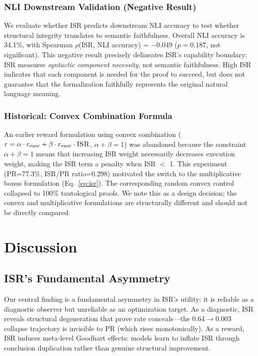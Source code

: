 \documentclass[11pt,a4paper]{article}
\newcommand{\isr}{\textsc{ISR}}
\newcommand{\pr}{\textsc{PR}}
\begin{document}
\subsubsection{NLI Downstream Validation (Negative Result)}
\label{sec:nli}

We evaluate whether \isr{} predicts downstream NLI accuracy to test whether structural integrity translates to semantic faithfulness.
Overall NLI accuracy is 34.1\%, with Spearman $\rho$(\isr{}, NLI accuracy) = $-0.049$ ($p{=}0.187$, not significant).
This negative result precisely delineates \isr{}'s capability boundary: \isr{} measures \emph{syntactic component necessity}, not semantic faithfulness.
High \isr{} indicates that each component is needed for the proof to succeed, but does not guarantee that the formalization faithfully represents the original natural language meaning.

\subsubsection{Historical: Convex Combination Formula}

An earlier reward formulation using convex combination ($r = \alpha \cdot r_{\text{exec}} + \beta \cdot r_{\text{exec}} \cdot \isr{}$, $\alpha + \beta = 1$) was abandoned because the constraint $\alpha + \beta = 1$ means that increasing \isr{} weight necessarily decreases execution weight, making the ISR term a penalty when \isr{} $<$ 1.
This experiment (PR=77.3\%, ISR/PR ratio=0.298) motivated the switch to the multiplicative bonus formulation (Eq.~\ref{eq:isr}).
The corresponding random convex control collapsed to 100\% tautological proofs.
We note this as a design decision; the convex and multiplicative formulations are structurally different and should not be directly compared.


\section{Discussion}
\label{sec:discussion}

\subsection{ISR's Fundamental Asymmetry}

Our central finding is a fundamental asymmetry in \isr{}'s utility: it is reliable as a diagnostic observer but unreliable as an optimization target.
As a diagnostic, \isr{} reveals structural degeneration that prove rate conceals---the 0.64$\to$0.003 collapse trajectory is invisible to \pr{} (which rises monotonically).
As a reward, \isr{} induces meta-level Goodhart effects: models learn to inflate \isr{} through conclusion duplication rather than genuine structural improvement.
\end{document}
